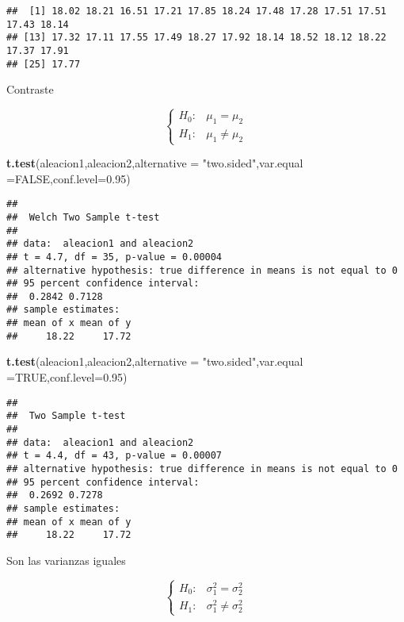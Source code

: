 \documentclass[
]{article}
\newenvironment{Shaded}{\begin{snugshade}}{\end{snugshade}}
\newcommand{\DataTypeTok}[1]{\textcolor[rgb]{0.13,0.29,0.53}{#1}}
\newcommand{\FloatTok}[1]{\textcolor[rgb]{0.00,0.00,0.81}{#1}}
\newcommand{\KeywordTok}[1]{\textcolor[rgb]{0.13,0.29,0.53}{\textbf{#1}}}
\newcommand{\NormalTok}[1]{#1}
\newcommand{\OtherTok}[1]{\textcolor[rgb]{0.56,0.35,0.01}{#1}}
\newcommand{\StringTok}[1]{\textcolor[rgb]{0.31,0.60,0.02}{#1}}
\begin{document}
\begin{verbatim}
##  [1] 18.02 18.21 16.51 17.21 17.85 18.24 17.48 17.28 17.51 17.51 17.43 18.14
## [13] 17.32 17.11 17.55 17.49 18.27 17.92 18.14 18.52 18.12 18.22 17.37 17.91
## [25] 17.77
\end{verbatim}

Contraste

\[
\left\{
\begin{array}{ll}
H_0:&\mu_1=\mu_2\\ 
H_1:&\mu_1\not=\mu_2
\end{array}
\right.
\]

\begin{Shaded}
\begin{Highlighting}[]
\KeywordTok{t.test}\NormalTok{(aleacion1,aleacion2,}\DataTypeTok{alternative =} \StringTok{"two.sided"}\NormalTok{,}\DataTypeTok{var.equal =}\OtherTok{FALSE}\NormalTok{,}\DataTypeTok{conf.level=}\FloatTok{0.95}\NormalTok{)}
\end{Highlighting}
\end{Shaded}

\begin{verbatim}
## 
##  Welch Two Sample t-test
## 
## data:  aleacion1 and aleacion2
## t = 4.7, df = 35, p-value = 0.00004
## alternative hypothesis: true difference in means is not equal to 0
## 95 percent confidence interval:
##  0.2842 0.7128
## sample estimates:
## mean of x mean of y 
##     18.22     17.72
\end{verbatim}

\begin{Shaded}
\begin{Highlighting}[]
\KeywordTok{t.test}\NormalTok{(aleacion1,aleacion2,}\DataTypeTok{alternative =} \StringTok{"two.sided"}\NormalTok{,}\DataTypeTok{var.equal =}\OtherTok{TRUE}\NormalTok{,}\DataTypeTok{conf.level=}\FloatTok{0.95}\NormalTok{)}
\end{Highlighting}
\end{Shaded}

\begin{verbatim}
## 
##  Two Sample t-test
## 
## data:  aleacion1 and aleacion2
## t = 4.4, df = 43, p-value = 0.00007
## alternative hypothesis: true difference in means is not equal to 0
## 95 percent confidence interval:
##  0.2692 0.7278
## sample estimates:
## mean of x mean of y 
##     18.22     17.72
\end{verbatim}

Son las varianzas iguales

\[
\left\{
\begin{array}{ll}
H_0:&\sigma^2_1=\sigma^2_2\\ 
H_1:&\sigma^2_1\not=\sigma^2_2
\end{array}
\right.
\]
\end{document}
